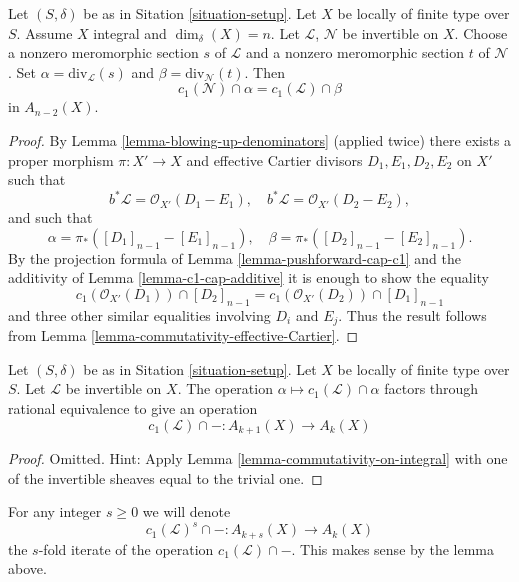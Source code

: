 \begin{lemma}
\label{lemma-commutativity-on-integral}
Let $(S, \delta)$ be as in Sitation \ref{situation-setup}.
Let $X$ be locally of finite type over $S$.
Assume $X$ integral and $\dim_\delta(X) = n$.
Let $\mathcal{L}$, $\mathcal{N}$ be invertible on $X$.
Choose a nonzero meromorphic section $s$ of $\mathcal{L}$
and a nonzero meromorphic section $t$ of $\mathcal{N}$.
Set $\alpha = \text{div}_{\mathcal{L}}(s)$ and
$\beta = \text{div}_{\mathcal{N}}(t)$.
Then
$$
c_1(\mathcal{N}) \cap \alpha
=
c_1(\mathcal{L}) \cap \beta
$$
in $A_{n - 2}(X)$.
\end{lemma}

\begin{proof}
By Lemma \ref{lemma-blowing-up-denominators} (applied twice)
there exists a proper morphism
$\pi : X' \to X$ and effective Cartier divisors
$D_1, E_1, D_2, E_2$ on $X'$ such that
$$
b^*\mathcal{L} = \mathcal{O}_{X'}(D_1 - E_1),
\quad
b^*\mathcal{L} = \mathcal{O}_{X'}(D_2 - E_2),
$$
and such that
$$
\alpha = \pi_*([D_1]_{n - 1} - [E_1]_{n - 1}),
\quad
\beta = \pi_*([D_2]_{n - 1} - [E_2]_{n - 1}).
$$
By the projection formula of Lemma \ref{lemma-pushforward-cap-c1}
and the additivity of Lemma \ref{lemma-c1-cap-additive}
it is enough to show the equality
$$
c_1(\mathcal{O}_{X'}(D_1)) \cap [D_2]_{n - 1}
=
c_1(\mathcal{O}_{X'}(D_2)) \cap [D_1]_{n - 1}
$$
and three other similar equalities involving $D_i$ and $E_j$.
Thus the result follows from Lemma \ref{lemma-commutativity-effective-Cartier}.
\end{proof}

\begin{lemma}
\label{lemma-factors}
Let $(S, \delta)$ be as in Sitation \ref{situation-setup}.
Let $X$ be locally of finite type over $S$.
Let $\mathcal{L}$ be invertible on $X$.
The operation $\alpha \mapsto c_1(\mathcal{L}) \cap \alpha$
factors through rational equivalence to give an operation
$$
c_1(\mathcal{L}) \cap - : A_{k + 1}(X) \to A_k(X)
$$
\end{lemma}

\begin{proof}
Omitted. Hint:
Apply Lemma \ref{lemma-commutativity-on-integral}
with one of the invertible sheaves equal to the
trivial one.
\end{proof}

\noindent
For any integer $s \geq 0$ we will denote
$$
c_1(\mathcal{L})^s \cap - : A_{k + s}(X) \to A_k(X)
$$
the $s$-fold iterate of the operation $c_1(\mathcal{L}) \cap - $.
This makes sense by the lemma above.

